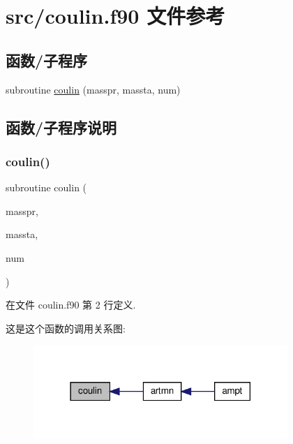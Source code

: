\hypertarget{coulin_8f90}{}\section{src/coulin.f90 文件参考}
\label{coulin_8f90}
\subsection*{函数/子程序}
\begin{DoxyCompactItemize}
\item 
subroutine \mbox{\hyperlink{coulin_8f90_ae7ab1a0472948e9ae31bf8ce0104d8e8}{coulin}} (masspr, massta, num)
\end{DoxyCompactItemize}


\subsection{函数/子程序说明}
\mbox{\label{coulin_8f90_ae7ab1a0472948e9ae31bf8ce0104d8e8}} 
\subsubsection{\texorpdfstring{coulin()}{coulin()}}
{\footnotesize\ttfamily subroutine coulin (\begin{DoxyParamCaption}\item[{}]{masspr,  }\item[{}]{massta,  }\item[{}]{num }\end{DoxyParamCaption})}



在文件 coulin.\+f90 第 2 行定义.

这是这个函数的调用关系图\+:
\nopagebreak
\begin{figure}[H]
\begin{center}
\leavevmode
\includegraphics[width=273pt]{coulin_8f90_ae7ab1a0472948e9ae31bf8ce0104d8e8_icgraph}
\end{center}
\end{figure}

